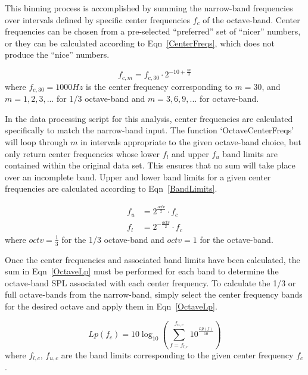\documentclass[twocolumn,10pt]{asme2ej}
\begin{document}
This binning process is accomplished by summing the narrow-band frequencies over intervals defined by specific center frequencies $f_c$ of the octave-band.  Center frequencies can be chosen from a pre-selected ``preferred'' set of ``nicer'' numbers, or they can be calculated according to Eqn~\ref{CenterFreqs}, which does not produce the ``nice'' numbers.

\begin{equation} \label{CenterFreqs}
f_{c,m} = f_{c,30}\cdot 2^{-10 + \frac{m}{3}}
\end{equation}
\noindent where $f_{c,30}=1000Hz$ is the center frequency corresponding to $m=30$, and $m=1,2,3,...$ for 1/3 octave-band and $m=3,6,9,...$ for octave-band.

In the data processing script for this analysis, center frequencies are calculated specifically to match the narrow-band input.  The function `OctaveCenterFreqs' will loop through $m$ in intervals appropriate to the given octave-band choice, but only return center frequencies whose lower $f_l$ and upper $f_u$ band limits are contained within the original data set.  This ensures that no sum will take place over an incomplete band.  Upper and lower band limits for a given center frequencies are calculated according to Eqn~\ref{BandLimits}.

\begin{equation} \label{BandLimits}
\begin{split}
f_u &= 2^{\frac{octv}{2}} \cdot f_c \\
f_l &= 2^{-\frac{octv}{2}} \cdot f_c
\end{split}
\end{equation}
\noindent where $octv=\frac{1}{3}$ for the 1/3 octave-band and $octv=1$ for the octave-band.

Once the center frequencies and associated band limits have been calculated, the sum in Eqn~\ref{OctaveLp} must be performed for each band to determine the octave-band SPL associated with each center frequency.  To calculate the 1/3 or full octave-bands from the narrow-band, simply select the center frequency bands for the desired octave and apply them in Eqn~\ref{OctaveLp}.

\begin{equation} \label{OctaveLp}
Lp(f_c) = 10\log_{10}\left( \sum_{f=f_{l,c}}^{f_{u,c}} 10^{\frac{Lp(f)}{10}} \right)
\end{equation}
\noindent where $f_{l,c},\,f_{u,c}$ are the band limits corresponding to the given center frequency $f_c$.
\end{document}
